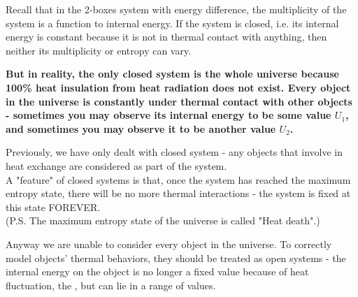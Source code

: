\documentclass[class=article, crop=false, 12pt]{standalone}
\begin{document}
Recall that in the 2-boxes system with energy difference,
the multiplicity of the system is a function to internal energy.
If the system is closed, 
i.e. its internal energy is constant because it is not in thermal contact with anything, 
then neither its multiplicity or entropy can vary.


\bf{But in reality, the only closed system is the whole universe}
because 100\% heat insulation from heat radiation does not exist.
Every object in the universe is constantly under thermal contact with other objects - 
sometimes you may observe its internal energy to be some value $U_1$,
and sometimes you may observe it to be another value $U_2$.

\begin{center}
\end{center}




Previously, we have only dealt with closed system - 
any objects that involve in heat exchange are considered as part of the system.
\\

\iffalse
A "feature" of closed systems is that, 
once the system has reached the maximum entropy state,
there will be no more thermal interactions -
the system is fixed at this state FOREVER.\\
(P.S. The maximum entropy state of the universe is called "Heat death".)



Anyway we are unable to consider every object in the universe.
To correctly model objects' thermal behaviors,
they should be treated as open systems - 
the internal energy on the object is no longer a fixed value because of heat fluctuation,
the ,
but can lie in a range of values.
\end{document}
